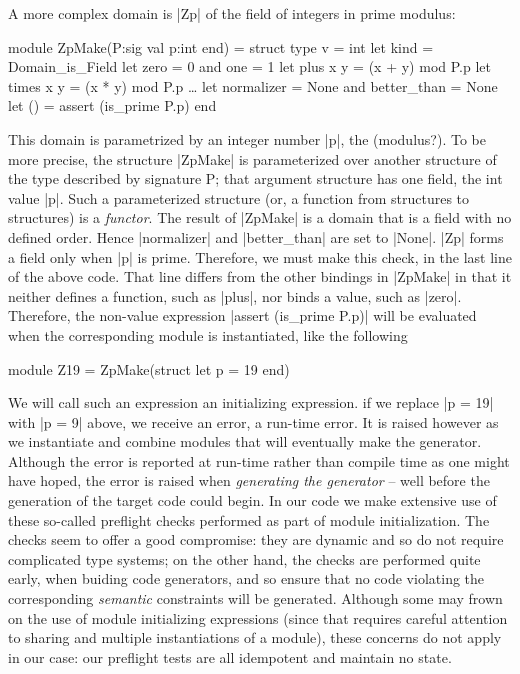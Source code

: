 \documentclass[draft]{elsart}
\begin{document}
A more complex domain is |Zp| of the field of integers in prime
modulus:
\begin{code}
module ZpMake(P:sig val p:int end) = struct
    type v = int
    let kind = Domain_is_Field
    let zero = 0 and one = 1
    let plus x y = (x + y) mod P.p
    let times x y = (x * y) mod P.p
    \dots
    let normalizer = None and better_than = None
    let () = assert (is_prime P.p)
end
\end{code}
This domain is parametrized by an integer number |p|, the
(modulus?). To be more precise, the structure |ZpMake| is
parameterized over another structure of the type described by
signature P; that argument structure has one field, the int value |p|.
Such a parameterized structure (or, a function from structures to
structures) is a \emph{functor}. The result of |ZpMake| is a domain that is a
field with no defined order. Hence
|normalizer| and |better_than| are set to |None|. |Zp| forms
a field only when |p| is prime. Therefore, we must make this check,
in the last line of the above code. That line differs from the other 
bindings in |ZpMake| in that it neither defines a function, such as
|plus|, nor binds a value, such as |zero|. Therefore, the non-value
expression |assert (is_prime P.p)| will be evaluated
when the corresponding module is instantiated, like the following
\begin{code}
module Z19 = ZpMake(struct let p = 19 end)
\end{code}
We will call such an expression an initializing expression.  if we
replace |p = 19| with |p = 9| above, we receive an error, a run-time
error. It is raised however as we instantiate and combine modules that
will eventually make the generator.  Although the error is reported at
run-time rather than compile time as one might have hoped, the error
is raised when \emph{generating the generator} -- well before the
generation of the target code could begin. In our code we make
extensive use of these so-called preflight checks performed as part of
module initialization. The checks seem to offer a good compromise:
they are dynamic and so do not require complicated type systems; on
the other hand, the checks are performed quite early, when buiding
code generators, and so ensure that no code violating the
corresponding \emph{semantic} constraints will be generated. Although
some may frown on the use of module initializing expressions (since
that requires careful attention to sharing and multiple instantiations
of a module), these concerns do not apply in our case: our preflight
tests are all idempotent and maintain no state.
\end{document}
